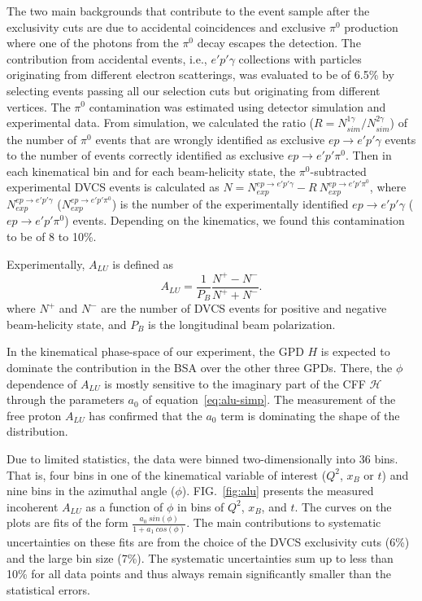 \documentclass[twocolumn,nofootinbib,showpacs,prl,superscriptaddress,secnumarabic,amssymb,nobibnotes,aps,floatfix]{revtex4}
\begin{document}
The two main backgrounds that contribute to the event sample after the exclusivity cuts are  
due to accidental coincidences and exclusive $\pi^0$ production where one of the photons 
from the $\pi^0$ decay escapes the detection. The contribution from accidental 
events, i.e., $e'p'\gamma$ collections 
with particles originating from different electron scatterings,
was evaluated to be of 6.5\% by selecting events passing all our selection cuts but originating from 
different vertices. The $\pi^0$ contamination was estimated using detector 
simulation and experimental data. From simulation, we calculated the ratio ($R 
= N^{1\gamma}_{sim}/N^{2\gamma}_{sim}$) of the number of $\pi^0$ events that 
are wrongly identified as exclusive $ep\rightarrow e'p'\gamma$ events to the 
number of events correctly identified as exclusive $ep\rightarrow e'p'\pi^0$.  
Then in each kinematical bin and for each beam-helicity state, the 
$\pi^0$-subtracted experimental DVCS events is calculated as $N = 
N^{ep\rightarrow e'p'\gamma}_{exp}- R~N^{ep\rightarrow e'p'\pi^0}_{exp}$, where 
$N^{ep\rightarrow e'p'\gamma}_{exp}$ ($N^{ep\rightarrow e'p'\pi^0}_{exp}$) is 
the number of the experimentally identified $ep\rightarrow e'p'\gamma$ 
($ep\rightarrow e'p'\pi^0$) events. Depending on the kinematics, we found this 
contamination to be of 8 to 10\%. 


Experimentally, $A_{LU}$ is defined as
\begin{equation}
A_{LU} = \frac{1}{P_{B}} \frac{N^{+} - N^{-}}{N^{+} + N^{-} }.
\end{equation}
where $N^{+}$ and $N^{-}$ are the number of DVCS events for positive and negative 
beam-helicity state, and $P_{B}$ is the longitudinal beam polarization.  

In the kinematical phase-space of our experiment, the GPD $H$ is
expected to dominate the 
contribution in the BSA over the other three GPDs. There, 
the $\phi$ dependence of $A_{LU}$ is mostly sensitive to the  
imaginary part of the CFF $\mathcal{H}$ through the parameters $a_0$ of 
equation~\ref{eq:alu-simp}. The measurement of the free proton 
$A_{LU}$ \cite{Girod:2007aa} has confirmed that the $a_0$ term is 
dominating the shape of the distribution. 

Due to limited statistics, the data were binned two-dimensionally into 36 bins.  
That is, four bins in one of the kinematical variable of interest ($Q^{2}$, 
$x_{B}$ or $t$) and nine bins in the azimuthal angle ($\phi$).  
FIG.~\ref{fig:alu} presents the measured incoherent $A_{LU}$ as a function of 
$\phi$ in bins of $Q^{2}$, $x_{B}$, and $t$. The curves on the plots are fits 
of the form $\frac{a_{0}~sin(\phi)}{1+ a_{1}~cos(\phi)}$. The main contributions 
to systematic uncertainties on these fits are from the choice of the DVCS 
exclusivity cuts (6\%) and the large bin size (7\%). The systematic uncertainties
sum up to less than 10\% for all data points and thus always remain significantly 
smaller than the statistical errors.
\end{document}
